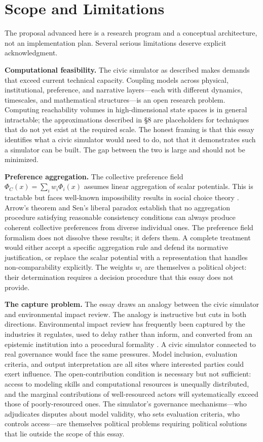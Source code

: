 \documentclass[12pt]{article}
\begin{document}
\section{Scope and Limitations}

The proposal advanced here is a research program and a conceptual architecture, not an implementation plan. Several serious limitations deserve explicit acknowledgment.

\textbf{Computational feasibility.} The civic simulator as described makes demands that exceed current technical capacity. Coupling models across physical, institutional, preference, and narrative layers---each with different dynamics, timescales, and mathematical structures---is an open research problem. Computing reachability volumes in high-dimensional state spaces is in general intractable; the approximations described in \S8 are placeholders for techniques that do not yet exist at the required scale. The honest framing is that this essay identifies what a civic simulator would need to do, not that it demonstrates such a simulator can be built. The gap between the two is large and should not be minimized.

\textbf{Preference aggregation.} The collective preference field $\Phi_C(x) = \sum_i w_i \Phi_i(x)$ assumes linear aggregation of scalar potentials. This is tractable but faces well-known impossibility results in social choice theory \cite{arrow1951,sen1970}. Arrow's theorem and Sen's liberal paradox establish that no aggregation procedure satisfying reasonable consistency conditions can always produce coherent collective preferences from diverse individual ones. The preference field formalism does not dissolve these results; it defers them. A complete treatment would either accept a specific aggregation rule and defend its normative justification, or replace the scalar potential with a representation that handles non-comparability explicitly. The weights $w_i$ are themselves a political object: their determination requires a decision procedure that this essay does not provide.

\textbf{The capture problem.} The essay draws an analogy between the civic simulator and environmental impact review. The analogy is instructive but cuts in both directions. Environmental impact review has frequently been captured by the industries it regulates, used to delay rather than inform, and converted from an epistemic institution into a procedural formality \cite{andrews1976}. A civic simulator connected to real governance would face the same pressures. Model inclusion, evaluation criteria, and output interpretation are all sites where interested parties could exert influence. The open-contribution condition is necessary but not sufficient: access to modeling skills and computational resources is unequally distributed, and the marginal contributions of well-resourced actors will systematically exceed those of poorly-resourced ones. The simulator's governance mechanisms---who adjudicates disputes about model validity, who sets evaluation criteria, who controls access---are themselves political problems requiring political solutions that lie outside the scope of this essay.
\end{document}
